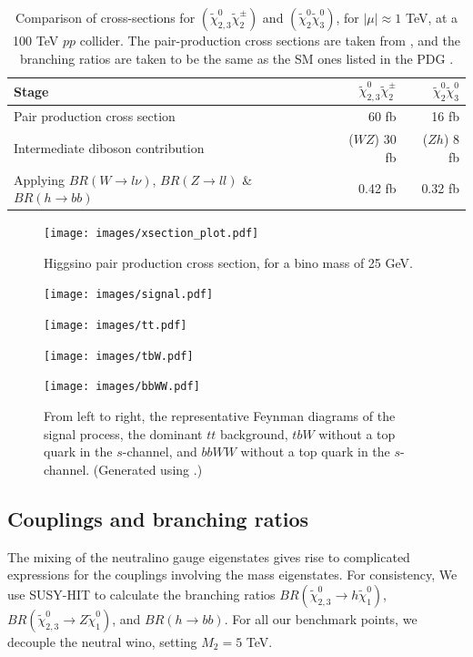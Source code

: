 \begin{table}
\centering
\begin{tabular}{l|rr}
\toprule
Stage & $\tilde{\chi}_{2,3}^0\tilde{\chi}^\pm_{2}$ & $\tilde{\chi}^0_{2}\tilde{\chi}^0_{3}$\\
\midrule
Pair production cross section & 60 fb & 16 fb\\
Intermediate diboson contribution & ($WZ$) 30 fb  & ($Zh$) 8 fb \\
Applying $BR(W\rightarrow l\nu)$, $BR(Z\rightarrow ll)$ \& $BR(h\rightarrow bb)$ & 0.42 fb & 0.32 fb\\
\bottomrule
\end{tabular}
\caption{Comparison of cross-sections for $(\tilde{\chi}_{2,3}^0\tilde{\chi}^\pm_{2})$ and $(\tilde{\chi}^0_{2}\tilde{\chi}^0_{3})$, for $|\mu|\approx 1$ TeV, at a 100 TeV $pp$ collider. The pair-production cross sections are taken from \citep{Gori:2014oua}, and the branching ratios are taken to be the same as the SM ones listed in the PDG \citep{Olive2016}.}
\label{tab:xsections}
\end{table}

\begin{figure}[h]
\centering
\texttt{[image: images/xsection\_plot.pdf]}
\caption{Higgsino pair production cross section, for a bino mass of 25 GeV.}
\label{fig:xsection_plot}
\end{figure}

\begin{figure}%
\centering
\parbox{.21\textwidth}{%
    \texttt{[image: images/signal.pdf]}%
}
\parbox{.21\textwidth}{%
    \texttt{[image: images/tt.pdf]}%
}
\parbox{.27\textwidth}{%
    \texttt{[image: images/tbW.pdf]}%
}
\parbox{.27\textwidth}{%
    \texttt{[image: images/bbWW.pdf]}%
}
\label{fig:feynman_diagrams}
\caption{From left to right, the representative Feynman diagrams of the signal process, the dominant $tt$ background, $tbW$ without a top quark in the
$s$-channel, and $bbWW$ without a top quark in the $s$-channel. (Generated using \cite{Ellis2016}.)}%
\end{figure}

\subsection{Couplings and branching ratios}

The mixing of the neutralino gauge eigenstates gives rise to complicated expressions for the couplings involving the mass eigenstates. For consistency, We use SUSY-HIT to calculate the branching ratios $BR(\tilde{\chi}_{2,3}^0\rightarrow h\tilde{\chi}_1^0)$,$BR(\tilde{\chi}_{2,3}^0\rightarrow Z\tilde{\chi}_1^0)$, and $BR(h\rightarrow bb)$. For all our benchmark points, we decouple the neutral wino, setting $M_2 = 5$ TeV.

